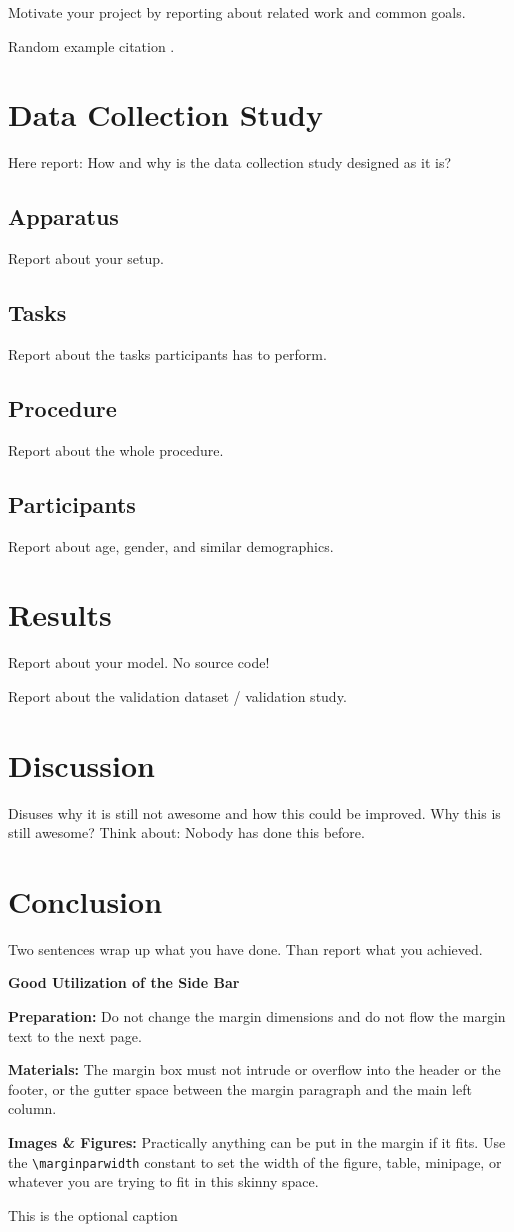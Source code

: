 \documentclass[sigchi-a, authorversion]{acmart}
\begin{document}
Motivate your project by reporting about related work and common goals.

Random example citation \cite{Le:2018:PalmTouch}.

\section{Data Collection Study}

Here report: How and why is the data collection study designed as it is?
\subsection{Apparatus}
Report about your setup.
\subsection{Tasks}
Report about the tasks participants has to perform.
\subsection{Procedure}
Report about the whole procedure.
\subsection{Participants}
Report about age, gender, and similar demographics.
\section{Results}
Report about your model. No source code!

Report about the validation dataset / validation study. 
\section{Discussion}
Disuses why it is still not awesome and how this could be improved. Why this is still awesome? Think about: Nobody has done this before. 
\section{Conclusion}
Two sentences wrap up what you have done. Than report what you achieved. 


\begin{sidebar}
  \textbf{Good Utilization of the Side Bar}

  \textbf{Preparation:} Do not change the margin
  dimensions and do not flow the margin text to the
  next page.

  \textbf{Materials:} The margin box must not intrude
  or overflow into the header or the footer, or the gutter space
  between the margin paragraph and the main left column.

  \textbf{Images \& Figures:} Practically anything
  can be put in the margin if it fits. Use the
  \texttt{{\textbackslash}marginparwidth} constant to set the
  width of the figure, table, minipage, or whatever you are trying
  to fit in this skinny space.

  \caption{This is the optional caption}
  \label{bar:sidebar}
\end{sidebar}
\end{document}
